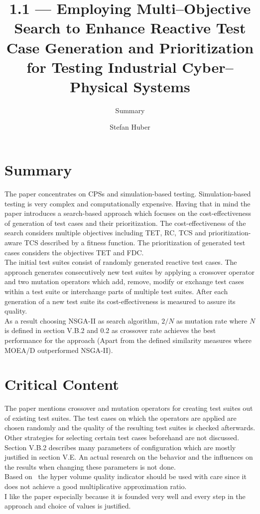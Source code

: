 \documentclass[oneside, notitlepage, twocolumn]{scrartcl}
\title{\LARGE 1.1 --- Employing Multi--Objective Search to Enhance Reactive Test Case Generation and Prioritization for Testing Industrial Cyber--Physical Systems}
\subtitle{Summary}
\author{Stefan Huber}
\begin{document}
\maketitle

\section{Summary}
The paper concentrates on \ac{CPS}s and simulation-based testing.
Simulation-based testing is very complex and computationally expensive.
Having that in mind the paper introduces a search-based approach which focuses on the cost-effectiveness of generation of test cases and their prioritization.
The cost-effectiveness of the search considers multiple objectives including \ac{TET}, \ac{RC}, \ac{TCS} and prioritization-aware \ac{TCS} described by a fitness function.
The prioritization of generated test cases considers the objectives \ac{TET} and \ac{FDC}.\\
The initial test suites consist of randomly generated reactive test cases.
The approach generates consecutively new test suites by applying a crossover operator and two mutation operators which add, remove, modify or exchange test cases within a test suite or interchange parts of multiple test suites.
After each generation of a new test suite its cost-effectiveness is measured to assure its quality.\\
As a result choosing \ac{NSGA-II} as search algorithm, \(2/N\) as mutation rate where \(N\) is defined in section V.B.2 and 0.2 as crossover rate achieves the best performance for the approach (Apart from the defined similarity measures where \ac{MOEA/D} outperformed \ac{NSGA-II}).

\section{Critical Content}
The paper mentions crossover and mutation operators for creating test suites out of existing test suites.
The test cases on which the operators are applied are chosen randomly and the quality of the resulting test suites is checked afterwards.
Other strategies for selecting certain test cases beforehand are not discussed.\\
Section V.B.2 describes many parameters of configuration which are mostly justified in section V.E.
An actual research on the behavior and the influences on the results when changing these parameters is not done.\\
Based on~\cite{bringmann13} the hyper volume quality indicator should be used with care since it does not achieve a good multiplicative approximation ratio.\\
I like the paper especially because it is founded very well and every step in the approach and choice of values is justified.
\end{document}
